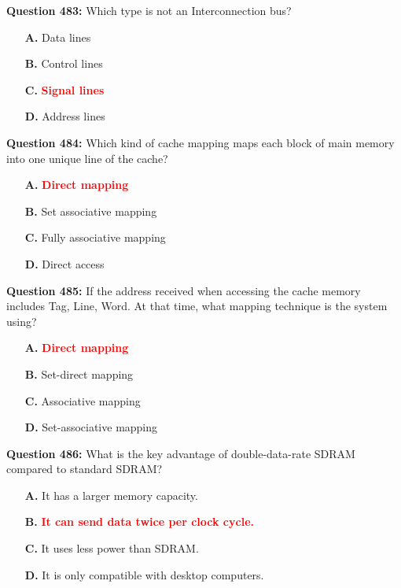 \documentclass[12pt,a4paper]{article}
\begin{document}
\vspace{0.5cm}

\textbf{Question 483:} Which type is not an Interconnection bus?

\begin{itemize}
    \item[\textbf{A.}] Data lines
    \item[\textbf{B.}] Control lines
    \item[\textbf{C.}] \textcolor{red}{\textbf{Signal lines}}
    \item[\textbf{D.}] Address lines
\end{itemize}

\vspace{0.5cm}

\textbf{Question 484:} Which kind of cache mapping maps each block of main memory into one unique line of the cache?

\begin{itemize}
    \item[\textbf{A.}] \textcolor{red}{\textbf{Direct mapping}}
    \item[\textbf{B.}] Set associative mapping
    \item[\textbf{C.}] Fully associative mapping
    \item[\textbf{D.}] Direct access
\end{itemize}

\vspace{0.5cm}

\textbf{Question 485:} If the address received when accessing the cache memory includes Tag, Line, Word. At that time, what mapping technique is the system using?

\begin{itemize}
    \item[\textbf{A.}] \textcolor{red}{\textbf{Direct mapping}}
    \item[\textbf{B.}] Set-direct mapping
    \item[\textbf{C.}] Associative mapping
    \item[\textbf{D.}] Set-associative mapping
\end{itemize}

\vspace{0.5cm}

\textbf{Question 486:} What is the key advantage of double-data-rate SDRAM compared to standard SDRAM?

\begin{itemize}
    \item[\textbf{A.}] It has a larger memory capacity.
    \item[\textbf{B.}] \textcolor{red}{\textbf{It can send data twice per clock cycle.}}
    \item[\textbf{C.}] It uses less power than SDRAM.
    \item[\textbf{D.}] It is only compatible with desktop computers.
\end{itemize}
\end{document}
